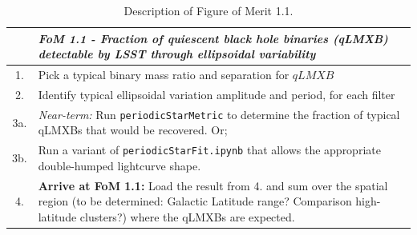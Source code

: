\begin{table}[h]
  \small
  \begin{tabular}{c p{12cm}}
    & {\it FoM 1.1 - Fraction of quiescent black hole binaries (qLMXB) detectable by LSST through ellipsoidal variability} \\
    \hline
  1. & Pick a typical binary mass ratio and separation for $qLMXB$ \\
  2. & Identify typical ellipsoidal variation amplitude and period, for each filter \\
  3a. & {\it Near-term:} Run {\tt periodicStarMetric} to determine the fraction of typical qLMXBs that would be recovered. Or; \\
  3b. & Run a variant of {\tt periodicStarFit.ipynb} that allows the appropriate double-humped lightcurve shape. \\
  4. & {\bf Arrive at FoM 1.1:} Load the result from 4. and sum over the spatial region (to be determined: Galactic Latitude range? Comparison high-latitude clusters?) where the qLMXBs are expected.\\
\hline
    \end{tabular}
 \caption{Description of Figure of Merit 1.1.}
  \label{table:pseudoFOM_1p1}
\end{table}


